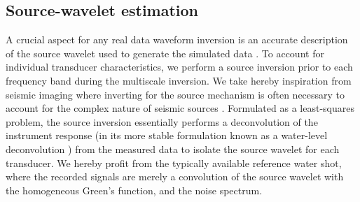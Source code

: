 \documentclass[12pt]{iopart}
\begin{document}
\subsection{Source-wavelet estimation}
\label{subsec: source_inversion}
A crucial aspect for any real data waveform inversion is an accurate description of the source wavelet used to generate the simulated data \cite{Cueto_sourcecalibration_2020}. To account for individual transducer characteristics, we perform a source inversion prior to each frequency band during the multiscale inversion. We take hereby inspiration from seismic imaging where inverting for the source mechanism is often necessary to account for the complex nature of seismic sources \cite{Pratt_1999_1,Groos_2014}. Formulated as a least-squares problem, the source inversion essentially performs a deconvolution of the instrument response (in its more stable formulation known as a water-level deconvolution \cite{Langston_1979}) from the measured data to isolate the source wavelet for each transducer. We hereby profit from the typically available reference water shot, where the recorded signals are merely a convolution of the source wavelet with the homogeneous Green's function, and the noise spectrum.    
\end{document}
